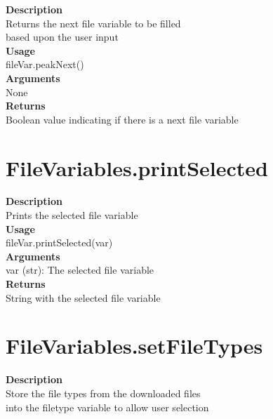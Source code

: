 \documentclass[11pt, oneside]{article}
\begin{document}
\textbf{Description} \\
        Returns the next file variable to be filled\\
        based upon the user input\\

\noindent\textbf{Usage} \\
        fileVar.peakNext() \\

\noindent\textbf{Arguments} \\
        None\\

\noindent\textbf{Returns} \\
        Boolean value indicating if there is a next file variable\\


\section{FileVariables.printSelected}

\textbf{Description} \\
        Prints the selected file variable\\

\noindent\textbf{Usage} \\
        fileVar.printSelected(var) \\

\noindent\textbf{Arguments} \\
        var (str): The selected file variable\\

\noindent\textbf{Returns} \\
        String with the selected file variable\\


\section{FileVariables.setFileTypes}

\textbf{Description} \\
        Store the file types from the downloaded files\\
        into the filetype variable to allow user selection\\
\end{document}
